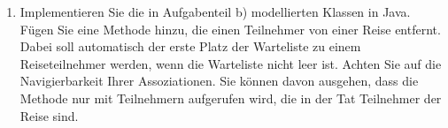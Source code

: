 \documentclass{lehramt-informatik-aufgabe}
\begin{document}
\begin{enumerate}

\item Implementieren Sie die in Aufgabenteil b) modellierten Klassen in
Java. Fügen Sie eine Methode hinzu, die einen Teilnehmer von einer Reise
entfernt. Dabei soll automatisch der erste Platz der Warteliste zu einem
Reiseteilnehmer werden, wenn die Warteliste nicht leer ist. Achten Sie
auf die Navigierbarkeit Ihrer Assoziationen. Sie können davon ausgehen,
dass die Methode nur mit Teilnehmern aufgerufen wird, die in der Tat
Teilnehmer der Reise sind.


\end{enumerate}
\end{document}
